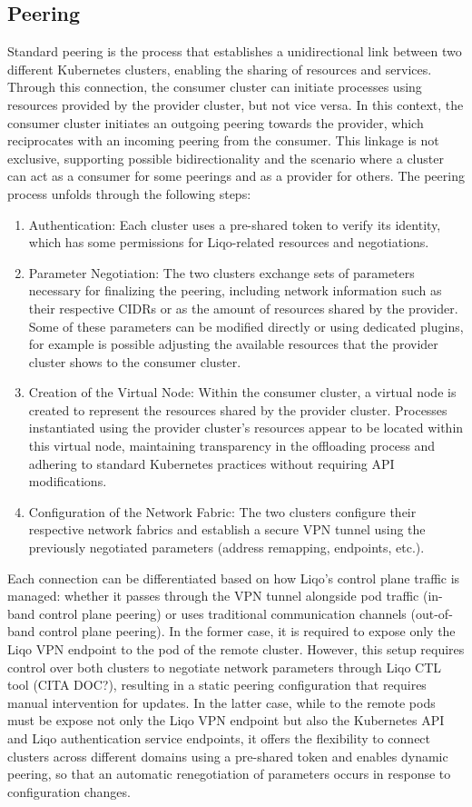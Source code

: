 \subsection{Peering}
Standard peering is the process that establishes a unidirectional link between two different Kubernetes clusters, enabling the sharing of resources and services. Through this connection, the consumer cluster can initiate processes using resources provided by the provider cluster, but not vice versa. In this context, the consumer cluster initiates an outgoing peering towards the provider, which reciprocates with an incoming peering from the consumer. This linkage is not exclusive, supporting possible bidirectionality and the scenario where a cluster can act as a consumer for some peerings and as a provider for others.
The peering process unfolds through the following steps:
\begin{enumerate}
\item Authentication: Each cluster uses a pre-shared token to verify its identity, which has some permissions for Liqo-related resources and negotiations.
\item Parameter Negotiation: The two clusters exchange sets of parameters necessary for finalizing the peering, including network information such as their respective CIDRs or as the amount of resources shared by the provider. Some of these parameters can be modified directly or using dedicated plugins, for example is possible adjusting the available resources that the provider cluster shows to the consumer cluster.
\item Creation of the Virtual Node: Within the consumer cluster, a virtual node is created to represent the resources shared by the provider cluster. Processes instantiated using the provider cluster's resources appear to be located within this virtual node, maintaining transparency in the offloading process and adhering to standard Kubernetes practices without requiring API modifications.
\item Configuration of the Network Fabric: The two clusters configure their respective network fabrics and establish a secure VPN tunnel using the previously negotiated parameters (address remapping, endpoints, etc.).
\end{enumerate}
Each connection can be differentiated based on how Liqo's control plane traffic is managed: whether it passes through the VPN tunnel alongside pod traffic (in-band control plane peering) or uses traditional communication channels (out-of-band control plane peering). In the former case, it is required to expose only the Liqo VPN endpoint to the pod of the remote cluster. However, this setup requires control over both clusters to negotiate network parameters through Liqo CTL tool (CITA DOC?), resulting in a static peering configuration that requires manual intervention for updates. In the latter case, while to the remote pods must be expose not only the Liqo VPN endpoint but also the Kubernetes API and Liqo authentication service endpoints, it offers the flexibility to connect clusters across different domains using a pre-shared token and enables dynamic peering, so that an automatic renegotiation of parameters occurs in response to configuration changes.

